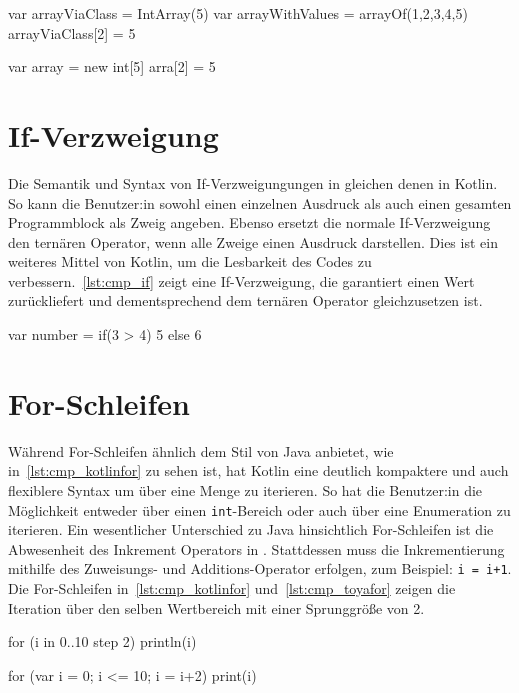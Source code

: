 \begin{KotlinCode}[numbers=none, caption={Felder in Kotlin}, label=lst:cmp_kotlinarrays]
var arrayViaClass = IntArray(5)
var arrayWithValues = arrayOf(1,2,3,4,5)
arrayViaClass[2] = 5
\end{KotlinCode}

\begin{ToyaCode}[numbers=none, caption={Felder in \toya}, label=lst:cmp_toyaarrays]
var array = new int[5]
arra[2] = 5
\end{ToyaCode}

\section{If-Verzweigung}

Die Semantik und Syntax von If-Verzweigungungen in \toya gleichen denen in Kotlin. So kann die Benutzer:in sowohl einen einzelnen Ausdruck als auch einen gesamten Programmblock als Zweig angeben. Ebenso ersetzt die normale If-Verzweigung den ternären Operator, wenn alle Zweige einen Ausdruck darstellen. Dies ist ein weiteres Mittel von Kotlin, um die Lesbarkeit des Codes zu verbessern.~\autoref{lst:cmp_if} zeigt eine If-Verzweigung, die garantiert einen Wert zurückliefert und dementsprechend dem ternären Operator gleichzusetzen ist.

\begin{KotlinCode}[numbers=none, caption={If-Ausdruck, der sowohl in Kotlin, als auch in \toya übersetzt}, label=lst:cmp_if]
var number = if(3 > 4) 5 else 6
\end{KotlinCode}

\section{For-Schleifen}

Während \toya For-Schleifen ähnlich dem Stil von Java anbietet, wie in~\autoref{lst:cmp_kotlinfor} zu sehen ist, hat Kotlin eine deutlich kompaktere und auch flexiblere Syntax um über eine Menge zu iterieren. So hat die Benutzer:in die Möglichkeit entweder über einen \texttt{int}-Bereich oder auch über eine Enumeration zu iterieren. Ein wesentlicher Unterschied zu Java hinsichtlich For-Schleifen ist die Abwesenheit des Inkrement Operators in \toya. Stattdessen muss die Inkrementierung mithilfe des Zuweisungs- und Additions-Operator erfolgen, zum Beispiel: \texttt{i = i+1}. Die For-Schleifen in~\autoref{lst:cmp_kotlinfor} und~\autoref{lst:cmp_toyafor} zeigen die Iteration über den selben Wertbereich mit einer Sprunggröße von 2.

\begin{KotlinCode}[numbers=none, caption={Einfache For-Schleife in Kotlin}, label=lst:cmp_kotlinfor]
for (i in 0..10 step 2) {
    println(i)
}
\end{KotlinCode}

\begin{ToyaCode}[numbers=none, caption={Einfache For-Schleife in toya}, label=lst:cmp_toyafor]
for (var i = 0; i <= 10; i = i+2) {
    print(i)
}
\end{ToyaCode}